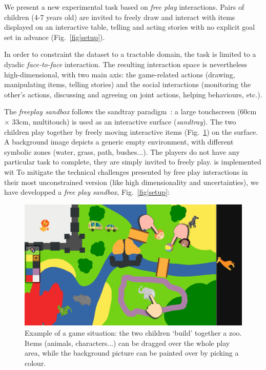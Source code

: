 \documentclass{article}
\begin{document}
We present a new experimental task based on \emph{free play} interactions. Pairs of
children (4-7 years old) are invited to freely draw and interact with items
displayed on an interactive table, telling and acting stories with no explicit
goal set in advance (Fig.~\ref{fig|setup}).

In order to constraint the dataset to a tractable domain, the task is limited to
a dyadic \emph{face-to-face} interaction.  The resulting interaction space is
nevertheless high-dimensional, with two main axis: the game-related actions
(drawing, manipulating items, telling stories) and the social interactions
(monitoring the other's actions, discussing and agreeing on joint actions,
helping behaviours, etc.).

The \emph{freeplay sandbox} follows the sandtray
paradigm~\cite{baxter2012touchscreen}: a large touchscreen (60cm $\times$ 33cm,
multitouch) is used as an interactive surface (\emph{sandtray}). The two children play together
by freely moving interactive items (Fig.~\ref{fig|sandbox}) on the surface. A background image
depicts a generic empty environment, with different symbolic zones (water,
grass, path, bushes...). The players do not have any particular task to
complete, they are simply invited to freely play.
is implemented wit To mitigate the technical challenges presented by free play interactions in
their most unconstrained version (like
high dimensionality and uncertainties), we have developped a \emph{free play
sandbox}, Fig.~\ref{fig|setup}: 


\begin{figure}
    \centering
    \includegraphics[width=0.9\linewidth]{sandbox}
    \caption{Example of a game situation: the two children `build'
    together a zoo. Items (animals, characters...) can be dragged over the whole
    play area, while the background picture can be painted over by picking a
    colour.}
    \label{fig|sandbox}
\end{figure}
\end{document}
